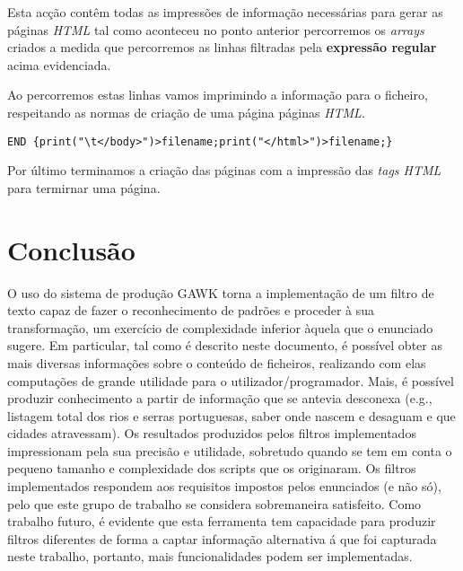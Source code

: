 \documentclass{report}
\begin{document}
    Esta acção contêm todas as impressões de informação necessárias para gerar as páginas \textit{HTML} tal como aconteceu no ponto anterior percorremos os \textit{arrays} criados a medida que percorremos as linhas filtradas pela \textbf{expressão regular} acima evidenciada. 

    Ao percorremos estas linhas vamos imprimindo a informação para o ficheiro, respeitando as normas de criação de uma página páginas \textit{HTML}. 

\begin{verbatim}
END {print("\t</body>")>filename;print("</html>")>filename;}
\end{verbatim}

    Por último terminamos a criação das páginas com a impressão das \textit{tags HTML} para termirnar uma página. 


\chapter{Conclusão} \label{concl}

    O uso do sistema de produção GAWK torna a implementação de um filtro de texto capaz de fazer o reconhecimento de padrões e proceder à sua transformação, um exercício de complexidade inferior àquela que o enunciado sugere. Em particular, tal como é descrito neste documento, é possível obter as mais diversas informações sobre o conteúdo de ficheiros, realizando com elas computações de grande utilidade para o utilizador/programador. Mais, é possível produzir conhecimento a partir de informação que se antevia desconexa (e.g., listagem total dos rios e serras portuguesas, saber onde nascem e desaguam e que cidades atravessam). Os resultados produzidos pelos filtros implementados impressionam pela sua precisão e utilidade, sobretudo quando se tem em conta o pequeno tamanho e complexidade dos scripts que os originaram. Os filtros implementados respondem aos requisitos impostos pelos enunciados (e não só), pelo que este grupo de trabalho se considera sobremaneira satisfeito. Como trabalho futuro, é evidente que esta ferramenta tem capacidade para produzir filtros diferentes de forma a captar informação alternativa á que foi capturada neste trabalho, portanto, mais funcionalidades podem ser implementadas.



\end{document}
